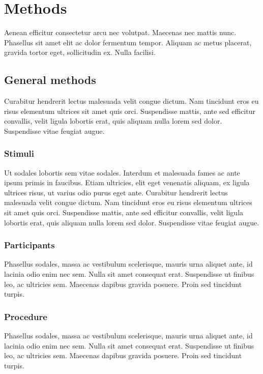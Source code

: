 \documentclass[12pt,oneside]{article}
\begin{document}
\section{Methods}\label{methods}

Aenean efficitur consectetur arcu nec volutpat. Maecenas nec mattis
nunc. Phasellus sit amet elit ac dolor fermentum tempor. Aliquam ac
metus placerat, gravida tortor eget, sollicitudin ex. Nulla facilisi.

\subsection{General methods}\label{general-methods}

Curabitur hendrerit lectus malesuada velit congue dictum. Nam tincidunt
eros eu risus elementum ultrices sit amet quis orci. Suspendisse mattis,
ante sed efficitur convallis, velit ligula lobortis erat, quis aliquam
nulla lorem sed dolor. Suspendisse vitae feugiat augue.

\subsubsection{Stimuli}\label{stimuli}

Ut sodales lobortis sem vitae sodales. Interdum et malesuada fames ac
ante ipsum primis in faucibus. Etiam ultricies, elit eget venenatis
aliquam, ex ligula ultrices risus, ut varius odio purus eget ante.
Curabitur hendrerit lectus malesuada velit congue dictum. Nam tincidunt
eros eu risus elementum ultrices sit amet quis orci. Suspendisse mattis,
ante sed efficitur convallis, velit ligula lobortis erat, quis aliquam
nulla lorem sed dolor. Suspendisse vitae feugiat augue.

\subsubsection{Participants}\label{participants}

Phasellus sodales, massa ac vestibulum scelerisque, mauris urna aliquet
ante, id lacinia odio enim nec sem. Nulla sit amet consequat erat.
Suspendisse ut finibus leo, ac ultricies sem. Maecenas dapibus gravida
posuere. Proin sed tincidunt turpis.

\subsubsection{Procedure}\label{procedure}

Phasellus sodales, massa ac vestibulum scelerisque, mauris urna aliquet
ante, id lacinia odio enim nec sem. Nulla sit amet consequat erat.
Suspendisse ut finibus leo, ac ultricies sem. Maecenas dapibus gravida
posuere. Proin sed tincidunt turpis.
\end{document}
